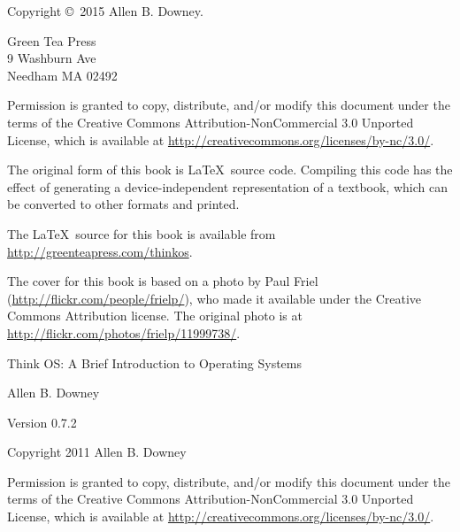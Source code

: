 \documentclass[12pt]{book}
\newcommand{\thetitle}{Think OS: A Brief Introduction to Operating Systems}
\newcommand{\theversion}{0.7.2}
\begin{document}
\begin{latexonly}
\begin{flushright}
\vfill

\end{flushright}


\pagebreak
\thispagestyle{empty}

{\small
Copyright \copyright ~2015 Allen B. Downey.


\vspace{0.2in}

\begin{flushleft}
Green Tea Press       \\
9 Washburn Ave \\
Needham MA 02492
\end{flushleft}

Permission is granted to copy, distribute, and/or modify this document
under the terms of the Creative Commons Attribution-NonCommercial 3.0 Unported
License, which is available at \url{http://creativecommons.org/licenses/by-nc/3.0/}.

The original form of this book is \LaTeX\ source code.  Compiling this
code has the effect of generating a device-independent representation
of a textbook, which can be converted to other formats and printed.

The \LaTeX\ source for this book is available from
\url{http://greenteapress.com/thinkos}.

The cover for this book is based on a photo by Paul Friel
(\url{http://flickr.com/people/frielp/}), who made it available under
the Creative Commons Attribution license.  The original photo
is at \url{http://flickr.com/photos/frielp/11999738/}.

\vspace{0.2in}

} %

\end{latexonly}



\begin{htmlonly}


{\Large \thetitle}

{\large Allen B. Downey}

Version \theversion

\vspace{0.25in}

Copyright 2011 Allen B. Downey

\vspace{0.25in}

Permission is granted to copy, distribute, and/or modify this document
under the terms of the Creative Commons Attribution-NonCommercial 3.0
Unported License, which is available at
\url{http://creativecommons.org/licenses/by-nc/3.0/}.

\setcounter{chapter}{-1}

\end{htmlonly}
\end{document}
